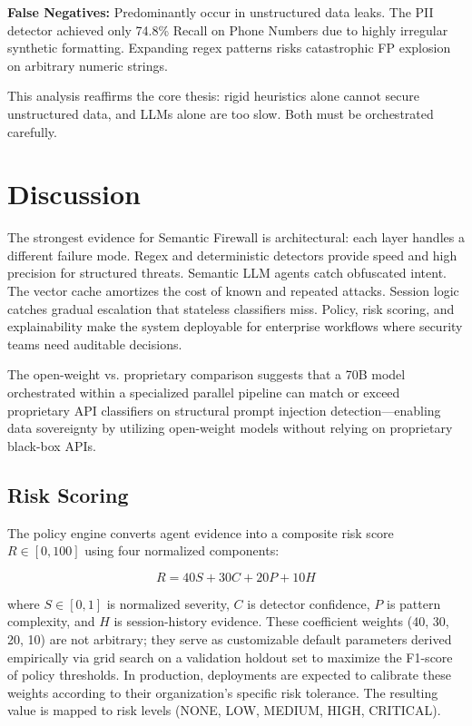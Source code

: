 \documentclass[conference]{IEEEtran}
\begin{document}
\textbf{False Negatives:} Predominantly occur in unstructured data leaks. The PII detector achieved only 74.8\% Recall on Phone Numbers due to highly irregular synthetic formatting. Expanding regex patterns risks catastrophic FP explosion on arbitrary numeric strings.

This analysis reaffirms the core thesis: rigid heuristics alone cannot secure unstructured data, and LLMs alone are too slow. Both must be orchestrated carefully.

\section{Discussion}

The strongest evidence for Semantic Firewall is architectural: each layer handles a different failure mode. Regex and deterministic detectors provide speed and high precision for structured threats. Semantic LLM agents catch obfuscated intent. The vector cache amortizes the cost of known and repeated attacks. Session logic catches gradual escalation that stateless classifiers miss. Policy, risk scoring, and explainability make the system deployable for enterprise workflows where security teams need auditable decisions.

The open-weight vs. proprietary comparison suggests that a 70B model orchestrated within a specialized parallel pipeline can match or exceed proprietary API classifiers on structural prompt injection detection---enabling data sovereignty by utilizing open-weight models without relying on proprietary black-box APIs.

\subsection{Risk Scoring}
The policy engine converts agent evidence into a composite risk score $R \in [0, 100]$ using four normalized components:

\begin{equation}
R = 40S + 30C + 20P + 10H
\end{equation}

where $S \in [0,1]$ is normalized severity, $C$ is detector confidence, $P$ is pattern complexity, and $H$ is session-history evidence. These coefficient weights (40, 30, 20, 10) are not arbitrary; they serve as customizable default parameters derived empirically via grid search on a validation holdout set to maximize the F1-score of policy thresholds. In production, deployments are expected to calibrate these weights according to their organization's specific risk tolerance. The resulting value is mapped to risk levels (NONE, LOW, MEDIUM, HIGH, CRITICAL).
\end{document}

